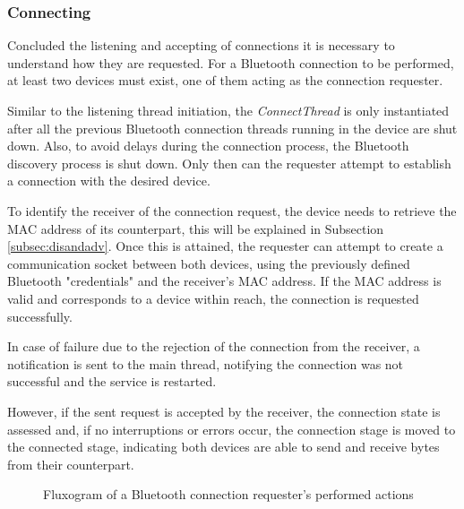 \subsubsection{Connecting}
\label{subsubsec:connecting}

Concluded the listening and accepting of connections it is necessary to understand how they are requested. For a Bluetooth connection to be performed, at least two devices must exist, one of them acting as the connection requester.

Similar to the listening thread initiation, the \textit{ConnectThread} is only instantiated after all the previous Bluetooth connection threads running in the device are shut down. Also, to avoid delays during the connection process, the Bluetooth discovery process is shut down. Only then can the requester attempt to establish a connection with the desired device.

To identify the receiver of the connection request, the device needs to retrieve the \gls{MAC} address of its counterpart, this will be explained in Subsection \ref{subsec:disandadv}. Once this is attained, the requester can attempt to create a communication socket between both devices, using the previously defined Bluetooth "credentials" and the receiver's \gls{MAC} address. If the \gls{MAC} address is valid and corresponds to a device within reach, the connection is requested successfully.

In case of failure due to the rejection of the connection from the receiver, a notification is sent to the main thread, notifying the connection was not successful and the service is restarted.

However, if the sent request is accepted by the receiver, the connection state is assessed and, if no interruptions or errors occur, the connection stage is moved to the connected stage, indicating both devices are able to send and receive bytes from their counterpart.

\begin{figure}[ht]
	\noindent{}
	\caption{\label{fig:btrequester} Fluxogram of a Bluetooth connection requester's performed actions}
\end{figure}

